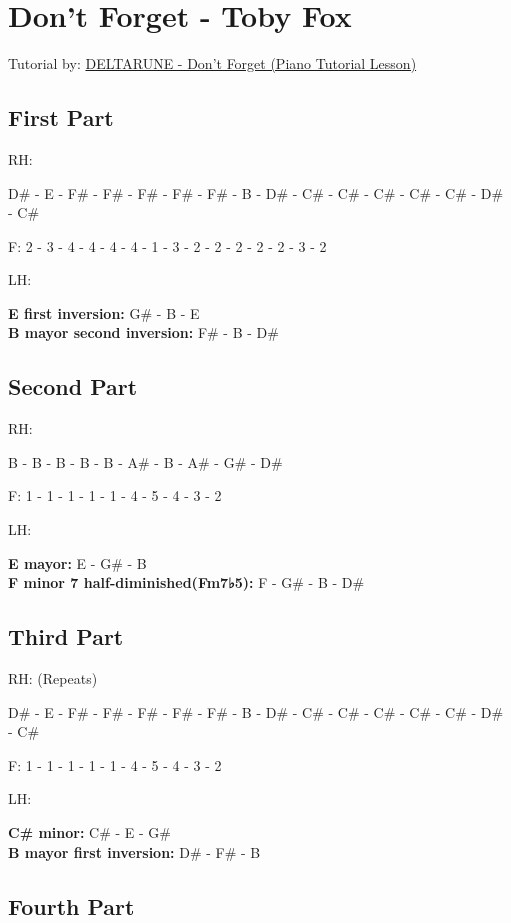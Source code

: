 
\section{Don't Forget - Toby Fox}

Tutorial by: \href{https://www.youtube.com/watch?v=PtHhFLqY0M8&list=PL62pKfyAHw_xC6McFiqvEhYiprsruziPT}{ DELTARUNE - Don't Forget (Piano Tutorial Lesson) }

\subsection{First Part}

RH: 

D\# - E - F\# - F\# - F\# - F\# - F\# - B - D\# - C\# - C\# - C\# - C\# - C\# - D\# - C\# 

F: 2 - 3 - 4 - 4 - 4 - 4 - 1 - 3 - 2 - 2 - 2 - 2 - 2 - 3 - 2


LH:

\textbf{E first inversion:} G\# - B - E\\
\textbf{B mayor second inversion:} F\# - B - D\#

\subsection{Second Part}

RH:

B - B - B - B - B - A\# - B - A\# - G\# - D\#

F: 1 - 1 - 1 - 1 - 1 - 4 - 5 - 4 - 3 - 2


LH:

\textbf{E mayor:} E - G\# - B\\
\textbf{F minor 7 half-diminished(Fm7♭5):} F - G\# - B - D\#

\subsection{Third Part}

RH: (Repeats)

D\# - E - F\# - F\# - F\# - F\# - F\# - B - D\# - C\# - C\# - C\# - C\# - C\# - D\# - C\# 

F: 1 - 1 - 1 - 1 - 1 - 4 - 5 - 4 - 3 - 2


LH:

\textbf{C\# minor:} C\# - E - G\#\\
\textbf{B mayor first inversion:} D\# - F\# - B

\subsection{Fourth Part}

